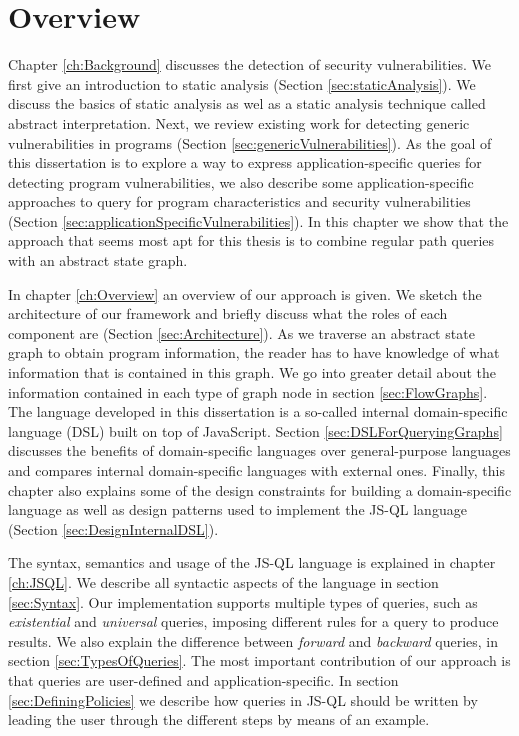 \section{Overview}

Chapter \ref{ch:Background} discusses the detection of security vulnerabilities. We first give an introduction to static analysis (Section \ref{sec:staticAnalysis}). We discuss the basics of static analysis as wel as a static analysis technique called abstract interpretation. Next, we review existing work for detecting generic vulnerabilities in programs (Section \ref{sec:genericVulnerabilities}). As the goal of this dissertation is to explore a way to express application-specific queries for detecting program vulnerabilities, we also describe some application-specific approaches to query for program characteristics and security vulnerabilities (Section \ref{sec:applicationSpecificVulnerabilities}). In this chapter we show that the approach that seems most apt for this thesis is to combine regular path queries with an abstract state graph.

In chapter \ref{ch:Overview} an overview of our approach is given. We sketch the architecture of our framework and briefly discuss what the roles of each component are (Section \ref{sec:Architecture}). As we traverse an abstract state graph to obtain program information, the reader has to have knowledge of what information that is contained in this graph. We go into greater detail about the information contained in each type of graph node in section \ref{sec:FlowGraphs}. The language developed in this dissertation is a so-called internal domain-specific language (DSL) built on top of JavaScript. Section  \ref{sec:DSLForQueryingGraphs} discusses the benefits of domain-specific languages over general-purpose languages and compares internal domain-specific languages with external ones. Finally, this chapter also explains some of the design constraints for building a domain-specific language as well as design patterns used to implement the JS-QL language (Section \ref{sec:DesignInternalDSL}).

The syntax, semantics and usage of the JS-QL language is explained in chapter \ref{ch:JSQL}. We describe all syntactic aspects of the language in section \ref{sec:Syntax}. Our implementation supports multiple types of queries, such as \textit{existential} and \textit{universal} queries, imposing different rules for a query to produce results. We also explain the difference between \textit{forward} and \textit{backward} queries, in section \ref{sec:TypesOfQueries}. The most important contribution of our approach is that queries are user-defined and application-specific. In section \ref{sec:DefiningPolicies} we describe how queries in JS-QL should be written by leading the user through the different steps by means of an example.

